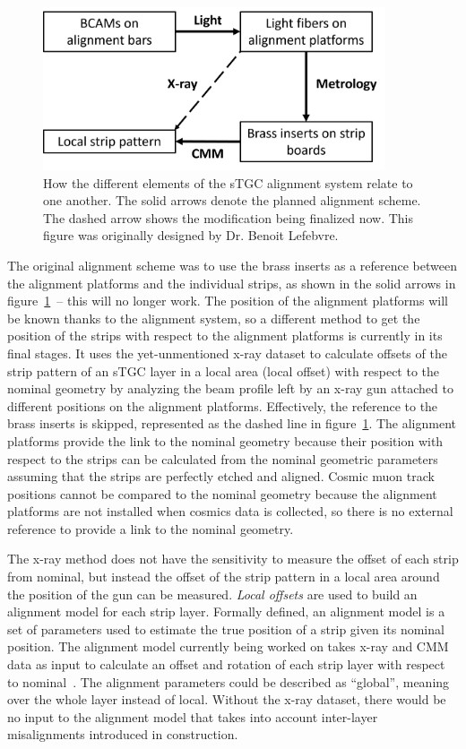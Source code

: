 \begin{figure}
    \centering
    \includegraphics[width = 0.9\textwidth]{figures/alignment_system_element_relations.png}
    \caption{How the different elements of the sTGC alignment system relate to one another. The solid arrows denote the planned alignment scheme. The dashed arrow shows the modification being finalized now. This figure was originally designed by Dr. Benoit Lefebvre.}
    \label{fig:alignment_elements}
\end{figure}

The original alignment scheme was to use the brass inserts as a reference between the alignment platforms and the individual strips, as shown in the solid arrows in figure~\ref{fig:alignment_elements}~-- this will no longer work. The position of the alignment platforms will be known thanks to the alignment system, so a different method to get the position of the strips with respect to the alignment platforms is currently in its final stages. It uses the yet-unmentioned x-ray dataset to calculate offsets of the strip pattern of an sTGC layer in a local area (local offset) with respect to the nominal geometry by analyzing the beam profile left by an x-ray gun attached to different positions on the alignment platforms. Effectively, the reference to the brass inserts is skipped, represented as the dashed line in figure~\ref{fig:alignment_elements}. The alignment platforms provide the link to the nominal geometry because their position with respect to the strips can be calculated from the nominal geometric parameters assuming that the strips are perfectly etched and aligned. Cosmic muon track positions cannot be compared to the nominal geometry because the alignment platforms are not installed when cosmics data is collected, so there is no external reference to provide a link to the nominal geometry.

The x-ray method does not have the sensitivity to measure the offset of each strip from nominal, but instead the offset of the strip pattern in a local area around the position of the gun can be measured. \textit{Local offsets} are used to build an alignment model for each strip layer. Formally defined, an alignment model is a set of parameters used to estimate the true position of a strip given its nominal position. The alignment model currently being worked on takes x-ray and CMM data as input to calculate an offset and rotation of each strip layer with respect to nominal~\cite{lefebvre_precision_2020}. The alignment parameters could be described as ``global'', meaning over the whole layer instead of local. Without the x-ray dataset, there would be no input to the alignment model that takes into account inter-layer misalignments introduced in construction. 


